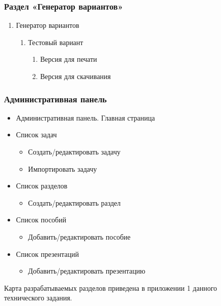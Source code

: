 \subsubsection{Раздел «Генератор вариантов»}
\begin{enumerate}
  \item Генератор вариантов
  \begin{enumerate}
    \item Тестовый вариант
    \begin{enumerate}
      \item Версия для печати
      \item Версия для скачивания
    \end{enumerate}
  \end{enumerate}
\end{enumerate}

\subsubsection{Административная панель}
\begin{itemize}
  \item Административная панель. Главная страница

  \item Список задач
  \begin{itemize}
    \item Создать/редактировать задачу
    \item Импортировать задачу
  \end{itemize}

  \item Список разделов
  \begin{itemize}
    \item Создать/редактировать раздел
  \end{itemize}

  \item Список пособий
  \begin{itemize}
    \item Добавить/редактировать пособие
  \end{itemize}

  \item Список презентаций
  \begin{itemize}
    \item Добавить/редактировать презентацию
  \end{itemize}
\end{itemize}

Карта разрабатываемых разделов приведена в приложении 1 данного технического задания.

